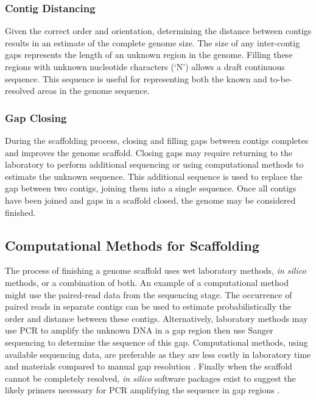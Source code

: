 \documentclass[10pt]{bmc_article}
\newenvironment{bmcformat}{\begin{raggedright}\baselineskip20pt\sloppy\setboolean{publ}{false}}{\end{raggedright}\baselineskip20pt\sloppy}
\begin{document}
\begin{bmcformat}
\subsubsection*{Contig Distancing} %

Given the correct order and orientation, determining the distance between
contigs results in an estimate of the complete genome size. The size of any
inter-contig gaps represents the length of an unknown region in the genome.
Filling these regions with unknown nucleotide characters (`N') allows a draft
continuous sequence. This sequence is useful for representing both the known
and to-be-resolved areas in the genome sequence.

\subsubsection*{Gap Closing} %

During the scaffolding process, closing and filling gaps between contigs
completes and improves the genome scaffold. Closing gaps may require returning
to the laboratory to perform additional sequencing or using computational
methods to estimate the unknown sequence. This additional sequence is used to
replace the gap between two contigs, joining them into a single sequence. Once
all contigs have been joined and gaps in a scaffold closed, the genome may be
considered finished.

\subsection*{Computational Methods for Scaffolding} %

The process of finishing a genome scaffold uses wet laboratory methods,
\emph{in silico} methods, or a combination of both. An example of a
computational method might use the paired-read data from the sequencing stage.
The occurrence of paired reads in separate contigs can be used to estimate
probabilistically the order and distance between these contigs. Alternatively,
laboratory methods may use PCR to amplify the unknown DNA in a gap region then
use Sanger sequencing to determine the sequence of this gap. Computational
methods, using available sequencing data, are preferable as they are less
costly in laboratory time and materials compared to manual gap resolution
\cite{nagarajan2010}. Finally when the scaffold cannot be completely resolved,
\emph{in silico} software packages exist to suggest the likely primers
necessary for PCR amplifying the sequence in gap regions \cite{gordon2001}. \pb


\end{bmcformat}
\end{document}
